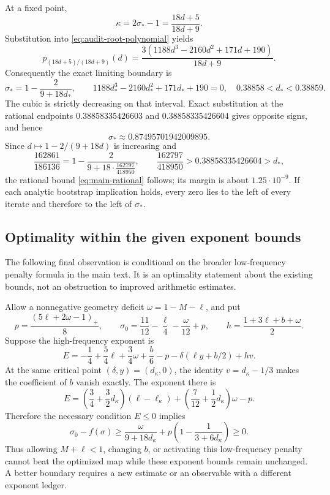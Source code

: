 \documentclass[11pt,a4paper]{article}
\numberwithin{equation}{section}
\theoremstyle{remark}
\begin{document}
At a fixed point,
\[
 \kappa=2\sigma_*-1=\frac{18d+5}{18d+9}.
\]
Substitution into \eqref{eq:audit-root-polynomial} yields
\[
 p_{(18d+5)/(18d+9)}(d)
 =\frac{3(1188d^3-2160d^2+171d+190)}{18d+9}.
\]
Consequently the exact limiting boundary is
\begin{equation}\label{eq:audit-exact-fixed-point}
 \boxed{\displaystyle
 \sigma_*=1-\frac2{9+18d_*},\qquad
 1188d_*^3-2160d_*^2+171d_*+190=0,
 \quad0.38858<d_*<0.38859.}
\end{equation}
The cubic is strictly decreasing on that interval.  Exact substitution
at the rational endpoints
\(0.38858335426603\) and \(0.38858335426604\) gives opposite signs,
and hence
\[
 \sigma_*\approx0.87495701942009895.
\]
Since \(d\mapsto1-2/(9+18d)\) is increasing and
\[
 \frac{162861}{186136}=1-\frac2{9+18\cdot\frac{162797}{418950}},
 \qquad
 \frac{162797}{418950}>0.38858335426604>d_*,
\]
the rational bound \eqref{eq:main-rational} follows; its margin is
about \(1.25\cdot10^{-9}\).
If each analytic bootstrap implication holds, every zero lies to the
left of every iterate and therefore to the left of \(\sigma_*\).

\subsection{Optimality within the given exponent bounds}

The following final observation is conditional on the broader
low-frequency penalty formula in the main text.  It is an optimality
statement about the existing bounds, not an obstruction to improved
arithmetic estimates.

Allow a nonnegative geometry deficit \(\omega=1-M-\ell\), and put
\[
 p=\frac{(5\ell+2\omega-1)_+}{8},\qquad
 \sigma_0=\frac{11}{12}-\frac\ell4-\frac\omega{12}+p,
 \qquad h=\frac{1+3\ell+b+\omega}{2}.
\]
Suppose the high-frequency exponent is
\[
 E=-\frac14+\frac54\ell+\frac34\omega+\frac b6-p
       -\delta(\ell y+b/2)+hv.
\]
At the same critical point \((\delta,y)=(d_\kappa,0)\), the identity
\(v=d_\kappa-1/3\) makes the coefficient of \(b\) vanish exactly.
The exponent there is
\[
 E=\left(\frac34+\frac32d_\kappa\right)(\ell-\ell_\kappa)
   +\left(\frac7{12}+\frac12d_\kappa\right)\omega-p.
\]
Therefore the necessary condition \(E\le0\) implies
\[
 \boxed{\displaystyle
 \sigma_0-f(\sigma)\ge
 \frac{\omega}{9+18d_\kappa}
 +p\left(1-\frac1{3+6d_\kappa}\right)\ge0.}
\]
Thus allowing \(M+\ell<1\), changing \(b\), or activating this
low-frequency penalty cannot beat the optimized map while these
exponent bounds remain unchanged.  A better boundary requires a new
estimate or an observable with a different exponent ledger.
\end{document}
